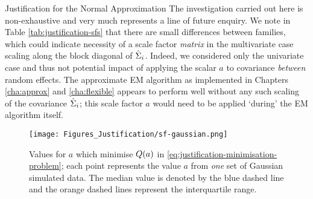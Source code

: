 \begin{chapter}{\label{cha:justification}Justification for the Normal Approximation}
  The investigation carried out here is non-exhaustive and very much represents a line of future enquiry. We note in Table \ref{tab:justification-sfs} that there are small differences between families, which could indicate necessity of a scale factor \textit{matrix} in the multivariate case \ie scaling along the block diagonal of $\hat{\Sigma}_i$. Indeed, we considered only the univariate case and thus not potential impact of applying the scalar $a$ to covariance \textit{between} random effects. The approximate EM algorithm as implemented in Chapters \ref{cha:approx} and \ref{cha:flexible} appears to perform well without any such scaling of the covariance $\hat{\Sigma}_i$; this scale factor $a$ would need to be applied `during' the EM algorithm itself.
  \begin{figure}
      \centering
      \texttt{[image: Figures\_Justification/sf-gaussian.png]}
      \caption{Values for $a$ which minimise $Q\!\left( a\right)$ in \eqref{eq:justification-minimisation-problem}; each point represents the value $a$ from \textit{one} set of Gaussian simulated data. The median value is denoted by the blue dashed line and the orange dashed lines represent the interquartile range.}
      \label{fig:justification-scalefactor-gaussian}
  \end{figure}
  
\end{chapter}